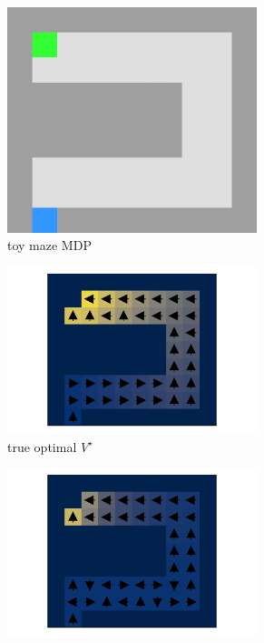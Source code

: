 \documentclass{article} %
\begin{document}
\begin{figure}
\begin{subfigure}{0.233\textwidth}
    \centering
    \includegraphics[width=0.8\textwidth]{images/maze/umaze.png}
    \caption{toy maze MDP \label{fig:umaze}}
\end{subfigure}%
\hspace{0.01mm}
\begin{subfigure}{0.235\textwidth}
    \centering
    \includegraphics[width=0.8\textwidth]{images/maze/umaze_ql.pdf}
    \caption{true optimal $V^\star$}
\end{subfigure}%
\hspace{0.01mm}
\begin{subfigure}{0.235\textwidth}
    \centering
    \includegraphics[width=0.8\textwidth]{images/maze/maze_2.pdf}

\end{subfigure}
\end{figure}
\end{document}
